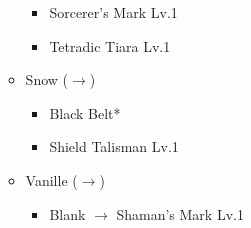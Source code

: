 \begin{menu}
\begin{itemize}
\begin{itemize}
				\begin{itemize}
					\item Sorcerer's Mark Lv.1
					\item Tetradic Tiara Lv.1
				\end{itemize}
			\item Snow ($\rightarrow$)
				\begin{itemize}
					\item Black Belt*
					\item Shield Talisman Lv.1
				\end{itemize}
			\item Vanille ($\rightarrow$)
				\begin{itemize}
					\item Blank $\rightarrow$ Shaman's Mark Lv.1
				\end{itemize}
		\end{itemize}
	\end{itemize}
\end{menu}